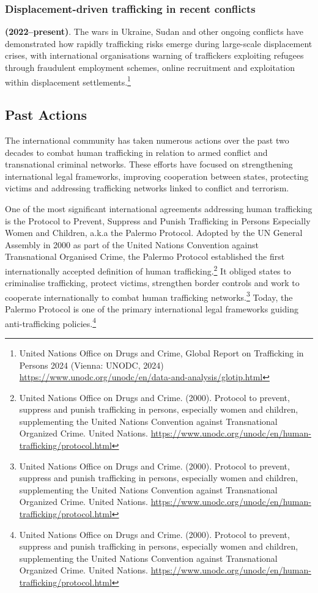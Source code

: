 \subsubsection{Displacement-driven trafficking in recent conflicts}

\textbf{(2022–present)}. The wars in Ukraine, Sudan and other ongoing conflicts have demonstrated how rapidly trafficking risks emerge during large-scale displacement crises, with international organisations warning of traffickers exploiting refugees through fraudulent employment schemes, online recruitment and exploitation within displacement settlements.\footnote{United Nations Office on Drugs and Crime, Global Report on Trafficking in Persons 2024 (Vienna: UNODC, 2024) \url{https://www.unodc.org/unodc/en/data-and-analysis/glotip.html}}

\subsection{Past Actions}

The international community has taken numerous actions over the past two decades to combat human trafficking in relation to armed conflict and transnational criminal networks. These efforts have focused on strengthening international legal frameworks, improving cooperation between states, protecting victims and addressing trafficking networks linked to conflict and terrorism.

One of the most significant international agreements addressing human trafficking is the Protocol to Prevent, Suppress and Punish Trafficking in Persons Especially Women and Children, a.k.a the Palermo Protocol. Adopted by the UN General Assembly in 2000 as part of the United Nations Convention against Transnational Organised Crime, the Palermo Protocol established the first internationally accepted definition of human trafficking.\footnote{United Nations Office on Drugs and Crime. (2000). Protocol to prevent, suppress and punish trafficking in persons, especially women and children, supplementing the United Nations Convention against Transnational Organized Crime. United Nations. \url{https://www.unodc.org/unodc/en/human-trafficking/protocol.html}} It obliged states to criminalise trafficking, protect victims, strengthen border controls and work to cooperate internationally to combat human trafficking networks.\footnote{United Nations Office on Drugs and Crime. (2000). Protocol to prevent, suppress and punish trafficking in persons, especially women and children, supplementing the United Nations Convention against Transnational Organized Crime. United Nations. \url{https://www.unodc.org/unodc/en/human-trafficking/protocol.html}} Today, the Palermo Protocol is one of the primary international legal frameworks guiding anti-trafficking policies.\footnote{United Nations Office on Drugs and Crime. (2000). Protocol to prevent, suppress and punish trafficking in persons, especially women and children, supplementing the United Nations Convention against Transnational Organized Crime. United Nations. \url{https://www.unodc.org/unodc/en/human-trafficking/protocol.html}}

